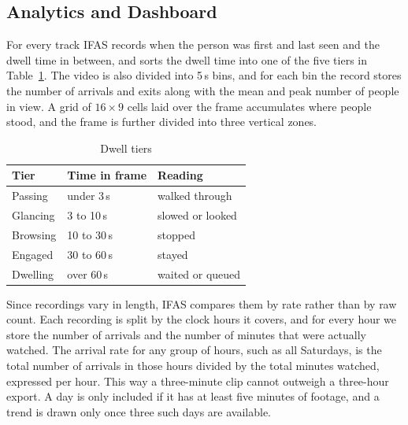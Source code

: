 \documentclass[conference]{IEEEtran}
\begin{document}
\subsection{Analytics and Dashboard}
\label{sec:dashboard}
For every track IFAS records when the person was first and last seen and the dwell
time in between, and sorts the dwell time into one of the five tiers in
Table~\ref{tab:tiers}. The video is also divided into 5\,s bins, and for each bin
the record stores the number of arrivals and exits along with the mean and peak
number of people in view. A grid of $16\times9$ cells laid over the frame
accumulates where people stood, and the frame is further divided into three
vertical zones.

\begin{table}[t]
\caption{Dwell tiers}
\label{tab:tiers}
\centering
\begin{tabular}{@{}lll@{}}
\toprule
Tier & Time in frame & Reading \\
\midrule
Passing  & under 3\,s    & walked through \\
Glancing & 3 to 10\,s    & slowed or looked \\
Browsing & 10 to 30\,s   & stopped \\
Engaged  & 30 to 60\,s   & stayed \\
Dwelling & over 60\,s    & waited or queued \\
\bottomrule
\end{tabular}
\end{table}

Since recordings vary in length, IFAS compares them by rate rather than by raw
count. Each recording is split by the clock hours it covers, and for every hour we
store the number of arrivals and the number of minutes that were actually watched.
The arrival rate for any group of hours, such as all Saturdays, is the total
number of arrivals in those hours divided by the total minutes watched, expressed
per hour. This way a three-minute clip cannot outweigh a three-hour export. A day
is only included if it has at least five minutes of footage, and a trend is drawn
only once three such days are available.
\end{document}

